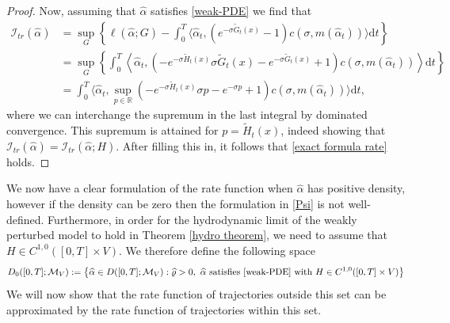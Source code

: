 \documentclass[11pt]{article}
\numberwithin{equation}{section}
\theoremstyle{definition}
\theoremstyle{plain}
\newcommand{\dd}{\mathrm{d}}
\newcommand{\nn}{\nonumber}
\begin{document}
\begin{proof}
Now, assuming that $\widehat{\alpha}$ satisfies \eqref{weak-PDE} we find that 
 \begin{align}
    \mathcal{I}_{tr}(\widehat{\alpha})
    &\nn= \sup_G\left\{\ell(\widehat{\alpha};G) - \int_0^T \langle \widehat{\alpha}_t, \left(e^{-\sigma\widetilde{G}_t(x)}-1\right)c(\sigma, m(\widehat{\alpha}_t)) \rangle \dd t \right\}\\
    \nn&= \sup_G \left\{\int_0^T \left\langle  \widehat{\alpha}_t, \left(-e^{-\sigma \widetilde{H}_t(x)} \sigma \widetilde{G}_t(x)- e^{-\sigma \widetilde{G}_t(x)} + 1 \right) c(\sigma, m(\widehat{\alpha}_t))\right\rangle \dd t\right\} \\
    &= \int_0^T \Big\langle \widehat{\alpha}_t, \sup_{p\in\mathbb{R}} \left(-e^{-\sigma \widetilde{H}_t(x)} \sigma p- e^{-\sigma p} + 1 \right) c(\sigma, m(\widehat{\alpha}_t))\Big\rangle \dd t,
    \end{align}
where we can interchange the supremum in the last integral by dominated convergence. This supremum is attained for $p=\widetilde{H}_t(x)$, indeed showing  that $\mathcal{I}_{tr}(\widehat{\alpha}) = \mathcal{I}_{tr}(\widehat{\alpha};H)$. After filling this in, it follows that \eqref{exact formula rate} holds. 
\end{proof}



We now have a clear formulation of the rate function when $\widehat{\alpha}$ has positive density, however if the density can be zero then the formulation in \eqref{Psi} is not well-defined. Furthermore, in order for the hydrodynamic limit of the weakly perturbed model to hold in Theorem \ref{hydro theorem}, we need to assume that $H \in C^{1,0}([0,T]\times V)$. We therefore define the following space 
    \begin{equation}
        D_0([0,T];\mathcal{M}_V) := \left\{\widehat{\alpha} \in D([0,T];\mathcal{M}_V): \widehat{\varrho} >0 , \text{ $\widehat{\alpha}$ satisfies \eqref{weak-PDE} with $H\in C^{1,0}([0,T]\times V)$} \right\}
    \end{equation}
We will now show that the rate function of trajectories outside this set can be approximated by the rate function of trajectories within this set.
\end{document}
